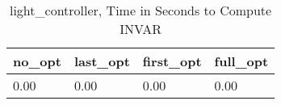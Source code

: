 \begin{table}
\caption{light\_controller, Time in Seconds to Compute INVAR}
\label{light_controller_INVAR_time}
\begin{tabular}{llll}
\toprule
no\_opt & last\_opt & first\_opt & full\_opt \\
\midrule
0.00 & 0.00 & 0.00 & 0.00 \\
\bottomrule
\end{tabular}
\end{table}
